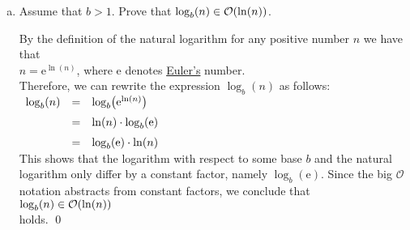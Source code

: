 \exercise
\begin{enumerate}[(a)]
\item Assume that $b > 1$.  Prove that $\log_{b}(n) \in \mathcal{O}(\ln(n))$.

      \solution
      By the definition of the natural logarithm for any positive number $n$ we have that
      \\[0.2cm]
      \hspace*{1.3cm}
      $n = \mathrm{e}^{\ln(n)}$, \quad where
      \href{http://en.wikipedia.org/wiki/E_(mathematical_constant)}{$\mathrm{e}$} denotes
      \href{https://en.wikipedia.org/wiki/Leonhard_Euler}{Euler's} number. 
      \\[0.2cm]
      Therefore, we can rewrite the expression $\log_b(n)$
      as follows:
      \\[0.2cm]
      \hspace*{1.3cm}
      $
      \begin{array}[t]{lcl}
        \log_b(n) & = & \log_b\bigl(\mathrm{e}^{\ln(n)}\bigr) \\[0.2cm]
                  & = & \ln(n) \cdot \log_b(\mathrm{e})      \\[0.2cm]
                  & = & \log_b(\mathrm{e}) \cdot \ln(n)
      \end{array}
      $
      \\[0.2cm]
      This shows that the logarithm with respect to some base $b$ and the natural logarithm 
      only differ by a constant factor, namely $\log_b(\mathrm{e})$.  Since the big $\mathcal{O}$ notation abstracts from
      constant factors, we conclude that
      \\[0.2cm]
      \hspace*{1.3cm}
      $\log_{b}(n) \in \mathcal{O}(\ln(n))$
      \\[0.2cm]
      holds. \qed


\end{enumerate}
